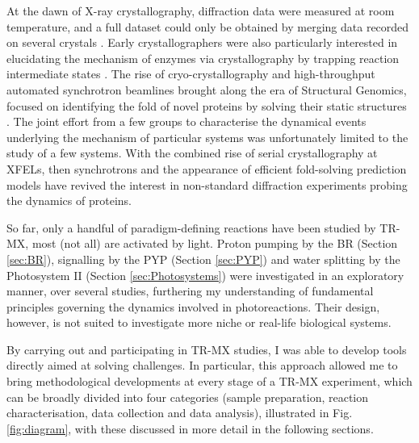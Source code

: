 At the dawn of X-ray crystallography, diffraction data were measured at room temperature, and a full dataset could only be obtained by merging data recorded on several crystals \parencite{kendrewThreeDimensionalModelMyoglobin1958}. Early crystallographers were also particularly interested in elucidating the mechanism of enzymes via crystallography by trapping reaction intermediate states \parencite{hendersonStructureCrystallineAchymotrypsin1970,makinenReactivityCryoenzymologyEnzymes1977}. The rise of cryo-crystallography \parencite{garmanMacromolecularCryocrystallography1997} and high-throughput automated synchrotron \parencite{joachimiakHighthroughputCrystallographyStructural2009} beamlines brought along the era of Structural Genomics, focused on identifying the fold of novel proteins by solving their static structures \parencite{burleyOverviewStructuralGenomics2000,chandoniaImpactStructuralGenomics2006}. The joint effort from a few groups to characterise the dynamical events underlying the mechanism of particular systems \parencite{srajerPhotolysisCarbonMonoxide1996,schotteWatchingProteinIt2003} was unfortunately limited to the study of a few systems. With the combined rise of serial crystallography at XFELs, then synchrotrons \parencite{brandenAdvancesChallengesTimeresolved2021} and the appearance of efficient fold-solving prediction models \parencite{cramerAlphaFold2FutureStructural2021,akdelStructuralBiologyCommunity2022,mccoyImplicationsAlphaFold2Crystallographic2022} have revived the interest in non-standard diffraction experiments probing the dynamics of proteins. 

So far, only a handful of paradigm-defining reactions have been studied by TR-MX, most (not all) are activated by light. Proton pumping by the BR (Section \ref{sec:BR}), signalling by the PYP  (Section \ref{sec:PYP}) and water splitting by the Photosystem II  (Section \ref{sec:Photosystems}) were investigated in an exploratory manner, over several studies, furthering my understanding of fundamental principles governing the dynamics involved in photoreactions. Their design, however, is not suited to investigate more niche or real-life biological systems. 

By carrying out and participating in TR-MX studies, I was able to develop tools directly aimed at solving challenges. In particular, this approach allowed me to bring methodological developments at every stage of a TR-MX experiment, which can be broadly divided into four categories (sample preparation, reaction characterisation, data collection and data analysis), illustrated in Fig. \ref{fig:diagram}, with these discussed in more detail in the following sections. 

